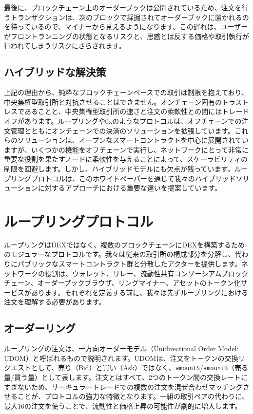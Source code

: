 \documentclass{article}
\begin{document}
\begin{multicols}{2}
最後に、ブロックチェーン上のオーダーブックは公開されているため、注文を行うトランザクションは、次のブロックで採掘されてオーダーブックに置かれるのを待っているので、マイナーから見えるようになります。この遅れは、ユーザーがフロントランニングの状態となるリスクと、思惑とは反する価格や取引執行が行われてしまうリスクにさらされます。

\subsection{ハイブリッドな解決策}
上記の理由から、純粋なブロックチェーンベースでの取引は制限を抱えており、中央集権型取引所と対抗させることはできません。オンチェーン固有のトラストレスであることと、中央集権型取引所の速さと注文の柔軟性との間にはトレードオフがあります。ループリングや0x\cite{warren20170x}のようなプロトコルは、オフチェーンでの注文管理とともにオンチェーンでの決済のソリューションを拡張しています。これらのソリューションは、オープンなスマートコントラクトを中心に展開されていますが、いくつかの機能をオフチェーンで実行し、ネットワークにとって非常に重要な役割を果たすノードに柔軟性を与えることによって、スケーラビリティの制限を回避します。しかし、ハイブリッドモデルにも欠点が残っています\cite{costofdecent}。ループリングプロトコルは、このホワイトペーパーを通じて我々のハイブリッドソリューションに対するアプローチにおける重要な違いを提案しています。

\section{ループリングプロトコル\label{sec:loopring_protocol}}
ループリングはDEXではなく、複数のブロックチェーンにDEXを構築するためのモジュラーなプロトコルです。我々は従来の取引所の構成部分を分解し、代わりにパブリックなスマートコントラクト群と分散したアクターを提供します。ネットワークの役割は、ウォレット、リレー、流動性共有コンソーシアムブロックチェーン、オーダーブックブラウザ、リングマイナー、アセットのトークン化サービスがあります。それぞれを定義する前に、我々は先ずループリングにおける注文を理解する必要があります。

\subsection{オーダーリング\label{sec:order_ring}}
ループリングの注文は、一方向オーダーモデル（Unidirectional Order Model: UDOM）\cite{coinport2014udom}と呼ばれるもので説明されます。UDOMは、注文をトークンの交換リクエストとして、売り（Bid）と買い（Ask）ではなく、\verb|amountS|/\verb|amountB|（売る量/買う量）として表します。注文とはすべて、2つのトークン間の交換レートにすぎないため、サーキュラートレードでの複数の注文を混ぜ合わせマッチングさせることが、プロトコルの強力な特徴となります。一組の取引ペアの代わりに、最大16の注文を使うことで、流動性と価格上昇の可能性が劇的に増大します。


\end{multicols}
\end{document}
